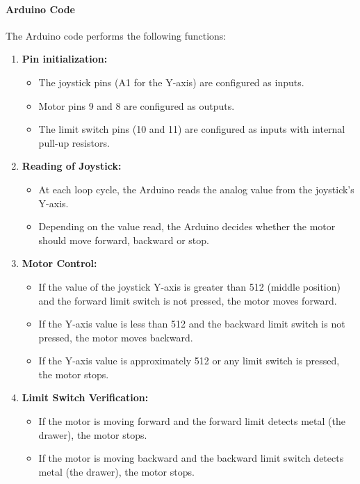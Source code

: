     
    \paragraph{\textbf{Arduino Code}
    }
    
    The Arduino code performs the following functions:
    
    \begin{enumerate}
        \item \textbf{Pin initialization:}
        \begin{itemize}
            \item The joystick pins (A1 for the Y-axis) are configured as inputs.
            \item Motor pins 9 and 8 are configured as outputs.
            \item The limit switch pins (10 and 11) are configured as inputs with internal pull-up resistors.
        \end{itemize}
        \item \textbf{Reading of Joystick:}
        \begin{itemize}
            \item At each loop cycle, the Arduino reads the analog value from the joystick's Y-axis.
            \item Depending on the value read, the Arduino decides whether the motor should move forward, backward or stop.
        \end{itemize}
        \item \textbf{Motor Control:}
        \begin{itemize}
            \item If the value of the joystick Y-axis is greater than 512 (middle position) and the forward limit switch is not pressed, the motor moves forward.
            \item If the Y-axis value is less than 512 and the backward limit switch is not pressed, the motor moves backward.
            \item If the Y-axis value is approximately 512 or any limit switch is pressed, the motor stops.
        \end{itemize}
        \item \textbf{Limit Switch Verification:}
        \begin{itemize}
            \item If the motor is moving forward and the forward limit detects  metal (the drawer), the motor stops.
            \item If the motor is moving backward and the backward limit switch detects  metal (the drawer), the motor stops.
    
        \end{itemize}
        
    \end{enumerate}
    
